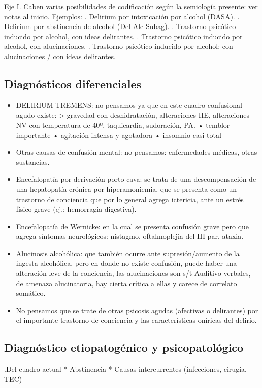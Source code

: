 Eje I. Caben varias posibilidades de codificación según la semiología presente: ver notas al inicio. Ejemplos: . Delirium por intoxicación por alcohol (DASA). . Delirium por abstinencia de alcohol (Del Alc Subag). . Trastorno psicótico inducido por alcohol, con ideas delirantes. . Trastorno psicótico inducido por alcohol, con alucinaciones. . Trastorno psicótico inducido por alcohol: con alucinaciones / con ideas delirantes.

\subsection*{Diagnósticos diferenciales}
\begin{itemize}
\item DELIRIUM TREMENS: no pensamos ya que en este cuadro confusional agudo existe: > gravedad con deshidratación, alteraciones HE, alteraciones NV con temperatura de 40º, taquicardia, sudoración, PA. • temblor importante • agitación intensa y agotadora • insomnio casi total
\item Otras causas de confusión mental: no pensamos: enfermedades médicas, otras sustancias.
\item Encefalopatía por derivación porto-cava: se trata de una descompensación de una hepatopatía crónica por hiperamoniemia, que se presenta como un trastorno de conciencia que por lo general agrega ictericia, ante un estrés físico grave (ej.: hemorragia digestiva).
\item Encefalopatía de Wernicke: en la cual se presenta confusión grave pero que agrega síntomas neurológicos: nistagmo, oftalmoplejia del III par, ataxia.
\item Alucinosis alcohólica: que también ocurre ante supresión/aumento de la ingesta alcohólica, pero en donde no existe confusión, puede haber una alteración leve de la conciencia, las alucinaciones son s/t Auditivo-verbales, de amenaza alucinatoria, hay cierta crítica a ellas y carece de correlato somático.
\item No pensamos que se trate de otras psicosis agudas (afectivas o delirantes) por el importante trastorno de conciencia y las características oníricas del delirio.
\end{itemize}
\subsection*{Diagnóstico etiopatogénico y psicopatológico}

.Del cuadro actual
* Abstinencia
* Causas intercurrentes (infecciones, cirugía, TEC)

